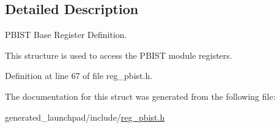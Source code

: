 \subsection{Detailed Description}
P\+B\+I\+ST Base Register Definition. 

This structure is used to access the P\+B\+I\+ST module registers. 

Definition at line 67 of file reg\+\_\+pbist.\+h.



The documentation for this struct was generated from the following file\+:\begin{DoxyCompactItemize}
\item 
generated\+\_\+launchpad/include/\mbox{\hyperlink{reg__pbist_8h}{reg\+\_\+pbist.\+h}}\end{DoxyCompactItemize}

